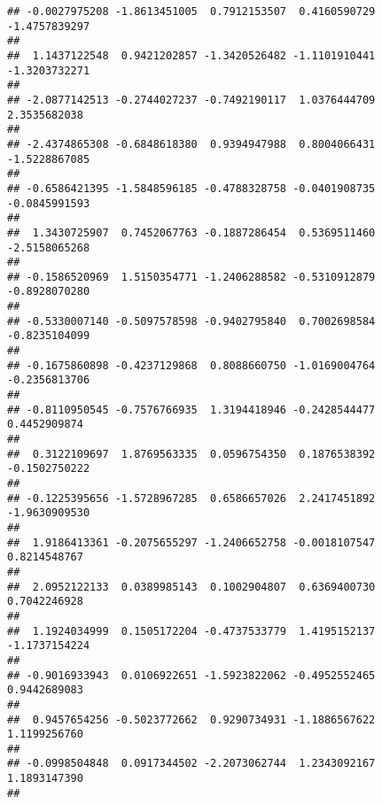 \documentclass[]{article}
\begin{document}
\begin{verbatim}
## -0.0027975208 -1.8613451005  0.7912153507  0.4160590729 -1.4757839297 
##                                                                       
##  1.1437122548  0.9421202857 -1.3420526482 -1.1101910441 -1.3203732271 
##                                                                       
## -2.0877142513 -0.2744027237 -0.7492190117  1.0376444709  2.3535682038 
##                                                                       
## -2.4374865308 -0.6848618380  0.9394947988  0.8004066431 -1.5228867085 
##                                                                       
## -0.6586421395 -1.5848596185 -0.4788328758 -0.0401908735 -0.0845991593 
##                                                                       
##  1.3430725907  0.7452067763 -0.1887286454  0.5369511460 -2.5158065268 
##                                                                       
## -0.1586520969  1.5150354771 -1.2406288582 -0.5310912879 -0.8928070280 
##                                                                       
## -0.5330007140 -0.5097578598 -0.9402795840  0.7002698584 -0.8235104099 
##                                                                       
## -0.1675860898 -0.4237129868  0.8088660750 -1.0169004764 -0.2356813706 
##                                                                       
## -0.8110950545 -0.7576766935  1.3194418946 -0.2428544477  0.4452909874 
##                                                                       
##  0.3122109697  1.8769563335  0.0596754350  0.1876538392 -0.1502750222 
##                                                                       
## -0.1225395656 -1.5728967285  0.6586657026  2.2417451892 -1.9630909530 
##                                                                       
##  1.9186413361 -0.2075655297 -1.2406652758 -0.0018107547  0.8214548767 
##                                                                       
##  2.0952122133  0.0389985143  0.1002904807  0.6369400730  0.7042246928 
##                                                                       
##  1.1924034999  0.1505172204 -0.4737533779  1.4195152137 -1.1737154224 
##                                                                       
## -0.9016933943  0.0106922651 -1.5923822062 -0.4952552465  0.9442689083 
##                                                                       
##  0.9457654256 -0.5023772662  0.9290734931 -1.1886567622  1.1199256760 
##                                                                       
## -0.0998504848  0.0917344502 -2.2073062744  1.2343092167  1.1893147390 
##                                                                       

\end{verbatim}
\end{document}
